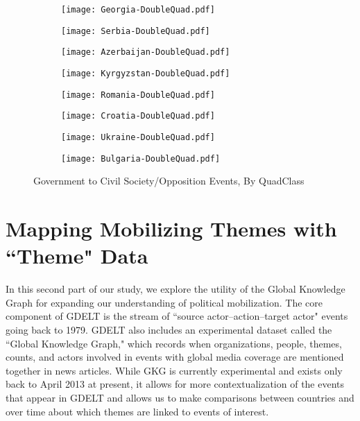 \documentclass[10pt]{article}
\begin{document}


\begin{figure*}
\begin{center}
\begin{subfigure}[b]{0.45\textwidth}
\texttt{[image: Georgia-DoubleQuad.pdf]}
\end{subfigure}
\begin{subfigure}[b]{0.45\textwidth}
\texttt{[image: Serbia-DoubleQuad.pdf]}
\end{subfigure}
\begin{subfigure}[b]{0.45\textwidth}
\texttt{[image: Azerbaijan-DoubleQuad.pdf]}
\end{subfigure}
\begin{subfigure}[b]{0.45\textwidth}
\texttt{[image: Kyrgyzstan-DoubleQuad.pdf]}
\end{subfigure}
\begin{subfigure}[b]{0.45\textwidth}
\texttt{[image: Romania-DoubleQuad.pdf]}
\end{subfigure}
\begin{subfigure}[b]{0.45\textwidth}
\texttt{[image: Croatia-DoubleQuad.pdf]}
\end{subfigure}
\begin{subfigure}[b]{0.45\textwidth}
\texttt{[image: Ukraine-DoubleQuad.pdf]}
\end{subfigure}
\begin{subfigure}[b]{0.45\textwidth}
\texttt{[image: Bulgaria-DoubleQuad.pdf]}
\end{subfigure}
\caption{Government to Civil Society/Opposition Events, By QuadClass}
\end{center}
\end{figure*}
\FloatBarrier



\section{Mapping Mobilizing Themes with ``Theme" Data}


In this second part of our study, we explore the utility of the Global Knowledge Graph for expanding our understanding of political mobilization.  The core component of GDELT is the stream of ``source actor--action--target actor" events going back to 1979. GDELT also includes an experimental dataset called the ``Global Knowledge Graph," which records when organizations, people, themes, counts, and actors involved in events with global media coverage are mentioned together in news articles. While GKG is currently experimental and exists only back to April 2013 at present, it allows for more contextualization of the events that appear in GDELT and allows us to make comparisons between countries and over time about which themes are linked to events of interest.
\end{document}
